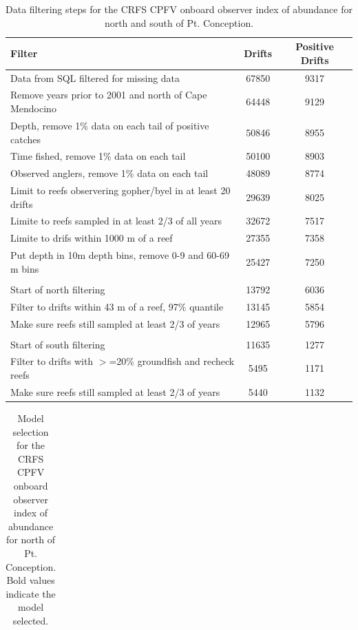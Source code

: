 \documentclass[12pt,]{article}
\begin{document}
\begin{table}[ht]
\centering
\caption{Data filtering steps for the CRFS CPFV onboard observer 
                                        index of abundance for north and south of Pt. Conception.} 
\label{tab:Fleet6_7_Filter}
\begin{tabular}{lcc}
  \hline
Filter & Drifts & Positive Drifts \\ 
  \hline
Data from SQL filtered for missing data & 67850 & 9317 \\ 
  Remove years prior to 2001 and north of Cape Mendocino & 64448 & 9129 \\ 
  Depth, remove 1\% data on each tail of positive catches & 50846 & 8955 \\ 
  Time fished, remove 1\% data on each tail & 50100 & 8903 \\ 
  Observed anglers, remove 1\% data on each tail & 48089 & 8774 \\ 
  Limit to reefs observering gopher/byel in at least 20 drifts & 29639 & 8025 \\ 
  Limite to reefs sampled in at least 2/3 of all years & 32672 & 7517 \\ 
  Limite to drifs within 1000 m of a reef & 27355 & 7358 \\ 
  Put depth in 10m depth bins, remove 0-9 and 60-69 m bins & 25427 & 7250 \\ 
   &  &  \\ 
  Start of north filtering & 13792 & 6036 \\ 
  Filter to drifts within 43 m of a reef, 97\% quantile & 13145 & 5854 \\ 
  Make sure reefs still sampled at least 2/3 of years & 12965 & 5796 \\ 
   &  &  \\ 
  Start of south filtering & 11635 & 1277 \\ 
  Filter to drifts with $>$=20\% groundfish and recheck reefs & 5495 & 1171 \\ 
  Make sure reefs still sampled at least 2/3 of years & 5440 & 1132 \\ 
   \hline
\end{tabular}
\end{table}\begin{table}[ht]
\centering
\caption{Model selection for the CRFS CPFV onboard observer 
                                        index of abundance for north of Pt. Conception. Bold 
                                        values indicate the model selected.} 
\label{tab:Fleet6_AIC}
\begin{tabular}{lll}

\end{tabular}
\end{table}
\end{document}
